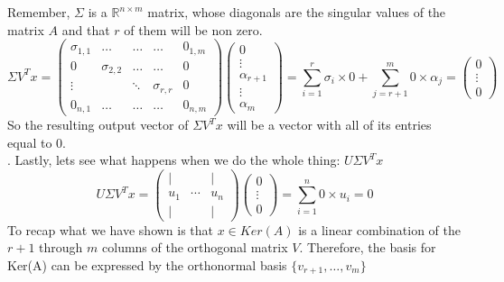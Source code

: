 \documentclass[12pt,twoside]{article}
\newcommand{\R}{\mathbb{R}}
\begin{document}
Remember, $\Sigma$ is a $\R^{n\times m}$ matrix, whose diagonals are the singular values of the matrix $A$ and that $r$ of them will be non zero.
$$
    \Sigma V^Tx = \begin{pmatrix}
    \sigma_{1,1} & \dots & \dots & \dots & 0_{1,m}\\
    0 & \sigma_{2,2} & \dots & \dots & 0 \\
    \vdots & & \ddots & \sigma_{r,r} & 0\\
    0_{n,1} & \dots & \dots & \dots & 0_{n,m}
    \end{pmatrix} \begin{pmatrix}
			0 \\
			\vdots \\
			\alpha_{r+1} \\
			\vdots \\
			\alpha_m
			\end{pmatrix} = \sum_{i=1}^r \sigma_i \times 0 + \sum_{j=r+1}^m 0 \times \alpha_j = 
			\begin{pmatrix}
			0 \\
			\vdots \\
			0
			\end{pmatrix}
$$
So the resulting output vector of $\Sigma V^T x$ will be a vector with all of its entries equal to 0. \\
.
Lastly, lets see what happens when we do the whole thing: $U\Sigma V^T x$
$$
U\Sigma V^T x = 
    \begin{pmatrix}
					| & & | \\
					u_1 & \!\cdots\! & u_n \\
					| & & | 
			\end{pmatrix} \begin{pmatrix}
			0 \\
			\vdots \\
            0
			\end{pmatrix} = \sum_{i=1}^n 0 \times u_i = 0
			$$
To recap what we have shown is that $x\in Ker(A)$ is a linear combination of the $r+1$ through $m$ columns of the orthogonal matrix $V$. Therefore, the basis for Ker(A) can be expressed by the orthonormal basis $\{v_{r+1}, \dots, v_m\}$\\
\end{document}

